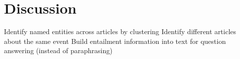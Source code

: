 \section{Discussion}

Identify named entities across articles by clustering
Identify different articles about the same event
Build entailment information into text for question answering (instead
of paraphrasing)
\citep{berant2014paraphrasing,berant2013freebase}
